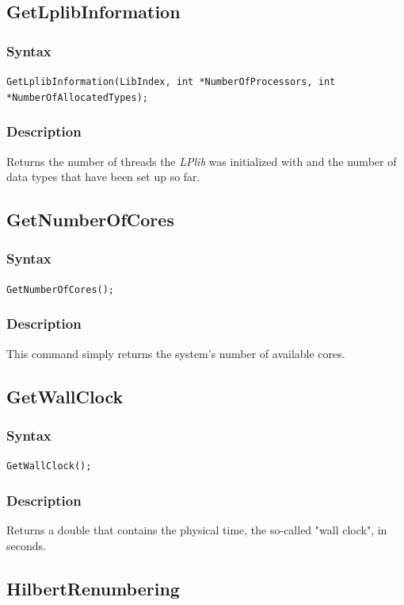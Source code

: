 \documentclass[a4paper,12pt]{article}
\begin{document}
\subsection{GetLplibInformation}

\subsubsection*{Syntax}
\tt{GetLplibInformation(LibIndex, int *NumberOfProcessors, int *NumberOfAllocatedTypes);}
\normalfont

\subsubsection*{Description}
Returns the number of threads the \emph{LPlib} was initialized with and the number of data types that have been set up so far.


\subsection{GetNumberOfCores}

\subsubsection*{Syntax}
\tt{GetNumberOfCores();}
\normalfont

\subsubsection*{Description}
This command simply returns the system's number of available cores.

\subsection{GetWallClock}

\subsubsection*{Syntax}
\tt{GetWallClock();}
\normalfont

\subsubsection*{Description}
Returns a double that contains the physical time, the so-called "wall clock", in seconds.

\subsection{HilbertRenumbering}
\end{document}
